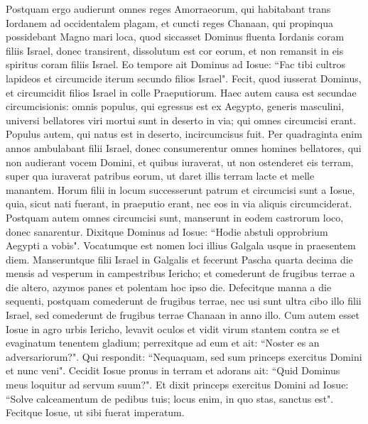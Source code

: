 \begin{biblechapter}  
\verse Postquam ergo audierunt omnes reges Amorraeorum, qui habitabant trans Iordanem ad occidentalem plagam, et cuncti reges Chanaan, qui propinqua possidebant Magno mari loca, quod siccasset Dominus fluenta Iordanis coram filiis Israel, donec transirent, dissolutum est cor eorum, et non remansit in eis spiritus coram filiis Israel. 
\verse Eo tempore ait Dominus ad Iosue: “Fac tibi cultros lapideos et circumcide iterum secundo filios Israel". 
\verse Fecit, quod iusserat Dominus, et circumcidit filios Israel in colle Praeputiorum. 
\verse Haec autem causa est secundae circumcisionis: omnis populus, qui egressus est ex Aegypto, generis masculini, universi bellatores viri mortui sunt in deserto in via; 
\verse qui omnes circumcisi erant. Populus autem, qui natus est in deserto, incircumcisus fuit. 
\verse Per quadraginta enim annos ambulabant filii Israel, donec consumerentur omnes homines bellatores, qui non audierant vocem Domini, et quibus iuraverat, ut non ostenderet eis terram, super qua iuraverat patribus eorum, ut daret illis terram lacte et melle manantem. 
\verse Horum filii in locum successerunt patrum et circumcisi sunt a Iosue, quia, sicut nati fuerant, in praeputio erant, nec eos in via aliquis circumciderat. 
\verse Postquam autem omnes circumcisi sunt, manserunt in eodem castrorum loco, donec sanarentur. 
\verse Dixitque Dominus ad Iosue: “Hodie abstuli opprobrium Aegypti a vobis". Vocatumque est nomen loci illius Galgala usque in praesentem diem. 
\verse Manseruntque filii Israel in Galgalis et fecerunt Pascha quarta decima die mensis ad vesperum in campestribus Iericho; 
\verse et comederunt de frugibus terrae a die altero, azymos panes et polentam hoc ipso die. 
\verse Defecitque manna a die sequenti, postquam comederunt de frugibus terrae, nec usi sunt ultra cibo illo filii Israel, sed comederunt de frugibus terrae Chanaan in anno illo. 
\verse Cum autem esset Iosue in agro urbis Iericho, levavit oculos et vidit virum stantem contra se et evaginatum tenentem gladium; perrexitque ad eum et ait: “Noster es an adversariorum?". 
\verse Qui respondit: “Nequaquam, sed sum princeps exercitus Domini et nunc veni". 
\verse Cecidit Iosue pronus in terram et adorans ait: “Quid Dominus meus loquitur ad servum suum?". 
\verse Et dixit princeps exercitus Domini ad Iosue: “Solve calceamentum de pedibus tuis; locus enim, in quo stas, sanctus est". Fecitque Iosue, ut sibi fuerat imperatum. 
\end{biblechapter}

